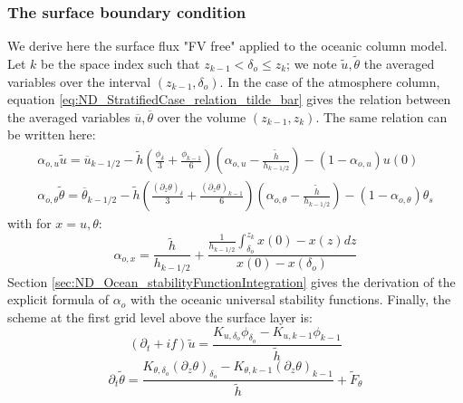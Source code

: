 \subsubsection{The surface boundary condition}
We derive here the surface flux "FV free" applied to the oceanic
column model. Let $k$ be the space index such that
$z_{k-1} < \delta_o \leq z_k$;
we note $\widetilde{u}, \widetilde{\theta}$
the averaged variables over the interval $(z_{k-1}, \delta_o)$.
In the case of the atmosphere column, equation
\eqref{eq:ND_StratifiedCase_relation_tilde_bar}
gives the relation between the averaged variables
$\overline{u}, \overline{\theta}$ over the volume $(z_{k-1}, z_{k})$.
The same relation can be written here:
\begin{equation}
\begin{aligned}
\label{eq:ND_Ocean_relation_tilde_bar}
\alpha_{o, u}\widetilde{u} = \overline{u}_{k-1/2} -
\widetilde{h}
	\left(\frac{\phi_{\delta}}{3} + \frac{\phi_{k-1}}{6}\right)
	\left(\alpha_{o, u} - \frac{\widetilde{h}}{h_{k-1/2}}\right)
	- (1 - \alpha_{o, u})u(0)\\
\alpha_{o, \theta}
\widetilde{\theta}
= \overline{\theta}_{k-1/2} -
	\widetilde{h}\left(\frac{{(\partial_z \theta)}_{\delta}}{3}
	+ \frac{{(\partial_z \theta)}_{k-1}}{6}\right)
	\left(\alpha_{o, \theta}-\frac{\widetilde{h}}{h_{k-1/2}}\right)
 - (1 - \alpha_{o, \theta})\theta_s
\end{aligned}
\end{equation}
with for $x = u, \theta$:
\begin{equation}
	\alpha_{o, x} = \frac{\widetilde{h}}{h_{k-1/2}} +
	\frac{\frac{1}{{h_{k-1/2}}}\int_{\delta_{o}}^{z_k} x(0) - x(z)
	dz}{x(0) - x(\delta_{o})}
\end{equation}
Section \ref{sec:ND_Ocean_stabilityFunctionIntegration}
gives the derivation of the explicit formula of $\alpha_{o}$
with the oceanic universal stability functions.
Finally, the scheme at the first grid level above
the surface layer is:
\begin{equation}
	\label{eq:ND_Ocean_semiDiscreteEkmanEqFVfree}
	(\partial_t+if) \widetilde{u}
	= \frac{K_{u, \delta_o}\phi_{\delta_o}
	- K_{u,k-1} \phi_{k-1}}{\widetilde{h}}
\end{equation}
\begin{equation}
	\label{eq:ND_Ocean_semiDiscreteEkmanEqPTFVfree}
	\partial_t \widetilde{\theta}
	= \frac{K_{\theta, \delta_o}{(\partial_z \theta)}_{\delta_o} -
	K_{\theta,k-1} {(\partial_z \theta)}_{k-1}}{\widetilde{h}}
	+ \widetilde{F}_\theta 
\end{equation}
